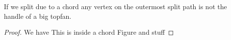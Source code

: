     \begin{lemma}
      \label{lm:sweep:NoTwoSplitsAboveEachOther}
      If we split due to a chord any vertex on the outermost split path is not the handle of a big topfan.
    \end{lemma}

    \begin{proof}
      We have
      This is inside a chord Figure and stuff
    \end{proof}

